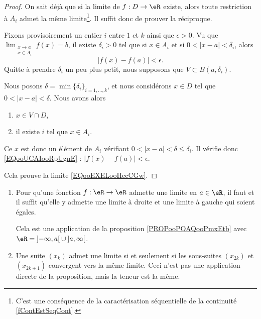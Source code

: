\begin{proof}On sait déjà que si la limite de \( f : D \to \eR\)
	existe, alors toute restriction à \( A_i\) admet la même limite\footnote{C'est une conséquence de la caractérisation séquentielle de la continuité \ref{fContEstSeqCont}.}. Il suffit donc de prouver la réciproque.

	Fixons provisoirement un entier \( i\) entre \( 1\) et \( k\) ainsi que \( \epsilon>0\). Vu que \( \lim_{\substack{x\to a\\x\in A_i}} f(x)=b\), il existe \( \delta_i>0\) tel que si \( x\in A_i\) et si \( 0<| x-a |<\delta_i\), alors
	\begin{equation}        \label{EQooUCAIooRpUgnE}
		| f(x)-f(a) |<\epsilon.
	\end{equation}
	Quitte à prendre \( \delta_i\) un peu plus petit, nous supposons que \( V\subset B(a,\delta_i)\).

	Nous posons \( \delta = \min\{\delta_i\}_{i=1,\ldots, k}\), et nous considérons \( x\in D\) tel que \( 0<| x-a |<\delta\). Nous avons alors
	\begin{enumerate}
		\item \( x\in V\cap D\),
		\item il existe \( i\) tel que \( x\in A_i\).
	\end{enumerate}
	Ce \( x\) est donc un élément de \( A_i\) vérifiant \( 0<| x-a |<\delta\leq \delta_i\). Il vérifie donc \eqref{EQooUCAIooRpUgnE} : \( | f(x)-f(a) |<\epsilon\).

	Cela prouve la limite \eqref{EQooEXELooHccCGw}.
\end{proof}

\begin{example}
	\begin{enumerate}
		\item Pour qu'une fonction \( f : \eR \to \eR\) admette une limite en \( a \in \eR\), il faut et il suffit qu'elle y admette une limite à droite et une limite à gauche qui soient égales.

		      Cela est une application de la proposition \ref{PROPooPOAQooPmxEtb} avec \( \eR=\mathopen] -\infty , a \mathclose[\cup\mathopen] a , \infty \mathclose[\).

		\item Une suite \( (x_k)\) admet une limite si et seulement si les
		      sous-suites \( (x_{2k})\) et \( (x_{2k+1})\) convergent vers la même
		      limite. Ceci n'est pas une application directe de la proposition,
		      mais la teneur est la même.
	\end{enumerate}
\end{example}

